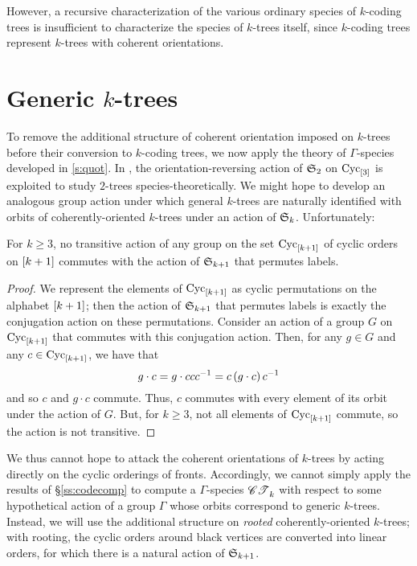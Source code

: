 \documentclass[distribution,draft]{brandiss} %
\numberwithin{section}{chapter}
\numberwithin{figure}{chapter}
\begin{document}
However, a recursive characterization of the various ordinary species of $k$-coding trees is insufficient to characterize the species of $k$-trees itself, since $k$-coding trees represent $k$-trees with coherent orientations.

\section{Generic $k$-trees}\label{s:genkt}
To remove the additional structure of coherent orientation imposed on $k$-trees before their conversion to $k$-coding trees, we now apply the theory of $\Gamma$-species developed in \ref{s:quot}.
In \cite{gessel:spec2trees}, the orientation-reversing action of $ \mathfrak{S}_{2} $ on $\operatorname{Cyc}_{\left[ {3} \right]}$ is exploited to study $2$-trees species-theoretically.
We might hope to develop an analogous group action under which general $k$-trees are naturally identified with orbits of coherently-oriented $k$-trees under an action of $ \mathfrak{S}_{k} $.
Unfortunately:
\begin{proposition}
  \label{prop:notransac}
  For $k \geq 3$, no transitive action of any group on the set $\operatorname{Cyc}_{\left[ {k+1} \right]}$ of cyclic orders on $\left[ {k+1} \right]$ commutes with the action of $ \mathfrak{S}_{k+1} $ that permutes labels.
\end{proposition}
\begin{proof}
  We represent the elements of $\operatorname{Cyc}_{\left[ {k+1} \right]}$ as cyclic permutations on the alphabet $\left[ {k+1} \right]$; then the action of $ \mathfrak{S}_{k+1} $ that permutes labels is exactly the conjugation action on these permutations.
  Consider an action of a group $G$ on $\operatorname{Cyc}_{\left[ {k+1} \right]}$ that commutes with this conjugation action.
  Then, for any $g \in G$ and any $c \in \operatorname{Cyc}_{\left[ {k+1} \right]}$, we have that
  \begin{equation}
    \label{eq:transaction}
    g \cdot c = g \cdot c c c^{-1} = c \left( {g \cdot c} \right) c^{-1}
  \end{equation}
  and so $c$ and $g \cdot c$ commute.
  Thus, $c$ commutes with every element of its orbit under the action of $G$.
  But, for $k \geq 3$, not all elements of $\operatorname{Cyc}_{\left[ {k+1} \right]}$ commute, so the action is not transitive.
\end{proof}

We thus cannot hope to attack the coherent orientations of $k$-trees by acting directly on the cyclic orderings of fronts.
Accordingly, we cannot simply apply the results of \S \ref{ss:codecomp} to compute a $\Gamma$-species $\mathscr{CT}_{k}^{}$ with respect to some hypothetical action of a group $\Gamma$ whose orbits correspond to generic $k$-trees.
Instead, we will use the additional structure on \emph{rooted} coherently-oriented $k$-trees; with rooting, the cyclic orders around black vertices are converted into linear orders, for which there is a natural action of $ \mathfrak{S}_{k+1} $.
\end{document}
